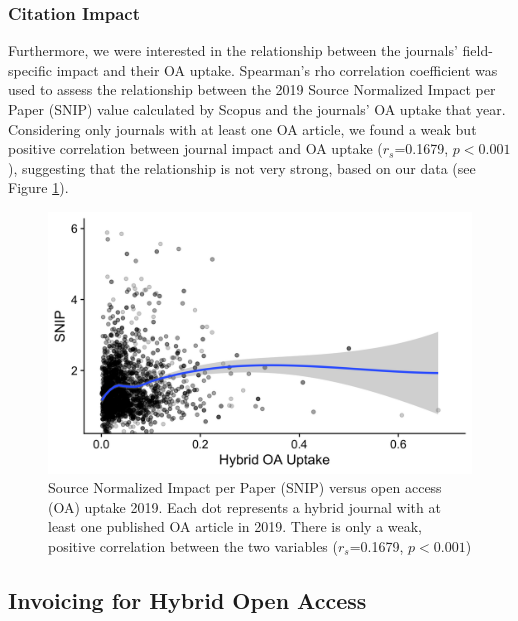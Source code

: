 \documentclass[a4paper,man,floatsintext,longtable,noextraspace,12pt]{apa6}
\begin{document}
\hypertarget{citation-impact}{%
\subsubsection*{Citation Impact}\label{citation-impact}}

Furthermore, we were interested in the relationship between the
journals' field-specific impact and their OA uptake. Spearman's rho
correlation coefficient was used to assess the relationship between the
2019 Source Normalized Impact per Paper (SNIP) value calculated by
Scopus and the journals' OA uptake that year. Considering only journals
with at least one OA article, we found a weak but positive correlation
between journal impact and OA uptake (\(r_s\)=0.1679, \(p<0.001\)),
suggesting that the relationship is not very strong, based on our data
(see Figure \ref{fig:sniptest}).

\begin{figure}[H]

{\centering \includegraphics[width=0.7\linewidth,]{manuscript_files/figure-latex/sniptest-1} 

}

\caption{Source Normalized Impact per Paper (SNIP) versus open access (OA) uptake 2019. Each dot represents a hybrid journal with at least one published OA article in 2019. There is only a weak, positive correlation between the two variables ($r_s$=0.1679, $p<0.001$)}\label{fig:sniptest}
\end{figure}

\hypertarget{invoicing-for-hybrid-open-access}{%
\subsection*{Invoicing for Hybrid Open
Access}\label{invoicing-for-hybrid-open-access}}
\end{document}
